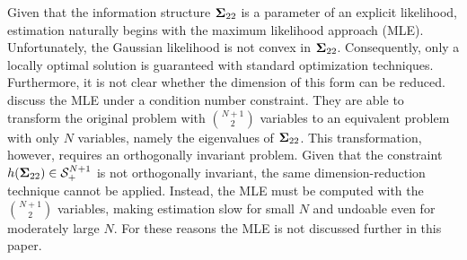 \documentclass[11pt]{article}
\theoremstyle{definition}
\theoremstyle{definition}
\def\bSigma{{\bf \Sigma}}
\begin{document}
Given that the information structure $\bSigma_{22}$ is a parameter of an explicit likelihood, estimation naturally begins with the maximum likelihood approach (MLE).  Unfortunately, the Gaussian likelihood is not convex in $\bSigma_{22}$. Consequently, only a locally optimal solution is guaranteed with standard optimization techniques. 
Furthermore, it is not clear whether the dimension of this form can be reduced. \cite{won2006maximum} discuss the MLE under a condition number constraint. They are able to transform the original problem with $\binom{N+1}{2}$ variables to an equivalent problem with only $N$ variables, namely the eigenvalues of $\bSigma_{22}$. This transformation, however, requires an orthogonally invariant problem. Given that the constraint $h(\bSigma_{22}) \in \mathcal{S}_{+}^{N+1}$ is not orthogonally invariant, the same dimension-reduction technique cannot be applied. Instead, the MLE must be computed with the $\binom{N+1}{2}$ variables, making estimation slow for small $N$ and undoable even for moderately large $N$. For these reasons the MLE is not discussed further in this paper.




\end{document}

